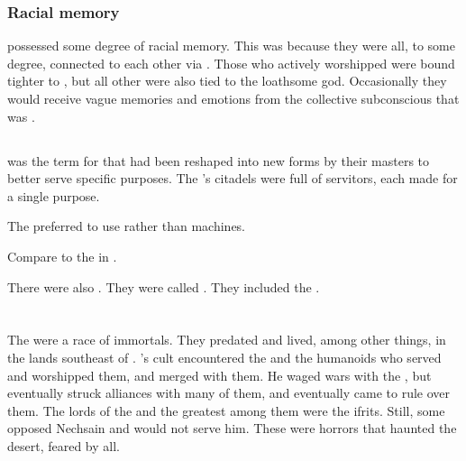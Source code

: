\subsubsection{Racial memory}
\Humans possessed some degree of racial memory. 
This was because they were all, to some degree, connected to each other via \Lithrim.
Those who actively worshipped \Iquin were bound tighter to \Lithrim, but all other \humans were also tied to the loathsome god. 
Occasionally they would receive vague memories and emotions from the collective subconscious that was \Lithrim. 









\subsection{\Shapens}
\index{\shapen}
 was the term for \humans that had been reshaped into new forms by their \resphan masters to better serve specific purposes. 
The \resphain's citadels were full of \shapen servitors, each made for a single purpose.

The \resphain preferred to use \shapen rather than machines. 

Compare to the  in \cite{GrahamMcNeill:Mechanicum}.

There were also \resphan \shapen. 
They were called . 
They included the .















\section{\Jinni}
\index{\jinni}
The \jinn were a race of immortals.
They predated \humans and lived, among other things, in the lands southeast of \Durcac. 
\Secherdamon's cult encountered the \jinn and the humanoids who served and worshipped them, and merged with them.
He waged wars with the \jinn, but eventually struck alliances with many of them, and eventually came to rule over them.
The lords of the \jinn and the greatest among them were the ifrits.
Still, some \jinn opposed Nechsain and would not serve him. 
These  \jinn were horrors that haunted the desert, feared by all.

